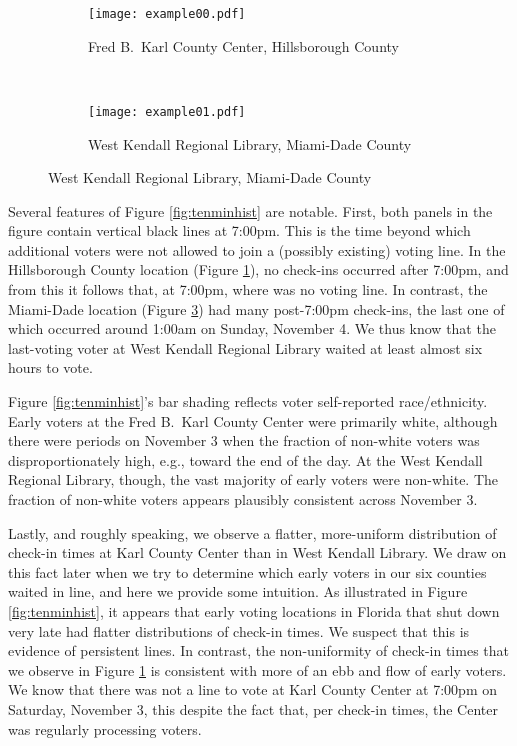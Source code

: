 \documentclass[12pt,titlepage]{article}
\begin{document}
\begin{figure}[!ht]
  \caption{Early voting check-in times on Saturday, November 3, 2012, in two Florida locations}
  \label{fig:tenminhist}
  \centering
  \begin{subfigure}[b]{\linewidth}
    \centering\texttt{[image: example00.pdf]}
    \caption{Fred B.\ Karl County Center, Hillsborough County}
    \label{fig:karlexample}
  \end{subfigure}%
  \\
  \begin{subfigure}[b]{\linewidth}
    \centering\texttt{[image: example01.pdf]}
    \caption{West Kendall Regional Library, Miami-Dade County}
    \label{fig:kendallexample}
  \end{subfigure}
\end{figure}

Several features of Figure \ref{fig:tenminhist} are notable.  First,
both panels in the figure contain vertical black lines at 7:00pm.
This is the time beyond which additional voters were not allowed to
join a (possibly existing) voting line.  In the Hillsborough County
location (Figure \ref{fig:karlexample}), no check-ins occurred after
7:00pm, and from this it follows that, at 7:00pm, where was no voting
line.  In contrast, the Miami-Dade location (Figure
\ref{fig:kendallexample}) had many post-7:00pm check-ins, the last one
of which occurred around 1:00am on Sunday, November 4.  We thus know
that the last-voting voter at West Kendall Regional Library waited at
least almost six hours to vote.

Figure \ref{fig:tenminhist}'s bar shading reflects voter self-reported
race/ethnicity.  Early voters at the Fred B.\ Karl County Center were
primarily white, although there were periods on November 3 when the
fraction of non-white voters was disproportionately high, e.g., toward
the end of the day.  At the West Kendall Regional Library, though, the
vast majority of early voters were non-white.  The fraction of
non-white voters appears plausibly consistent across November 3.

Lastly, and roughly speaking, we observe a flatter, more-uniform
distribution of check-in times at Karl County Center than in West
Kendall Library.  We draw on this fact later when we try to determine
which early voters in our six counties waited in line, and here we
provide some intuition.  As illustrated in Figure
\ref{fig:tenminhist}, it appears that early voting locations in
Florida that shut down very late had flatter distributions of check-in
times.  We suspect that this is evidence of persistent lines.  In
contrast, the non-uniformity of check-in times that we observe in
Figure \ref{fig:karlexample} is consistent with more of an ebb and
flow of early voters.  We know that there was not a line to vote at
Karl County Center at 7:00pm on Saturday, November 3, this despite the
fact that, per check-in times, the Center was regularly processing
voters.
\end{document}
